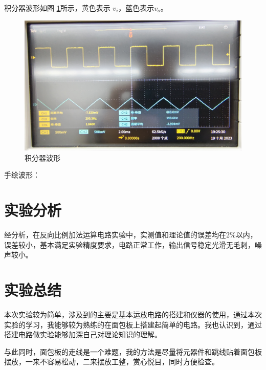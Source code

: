 \documentclass[a4paper]{article}
\theoremstyle{definition}
\theoremstyle{plain}
\theoremstyle{remark}
\newcommand{\reffig}[1]{图 \ref{#1}}
\begin{document}
积分器波形如\reffig{积分器波形}所示，黄色表示 $v_i$，蓝色表示$v_o$。
\begin{figure}[H]
	\centering
	\includegraphics[width=1\textwidth]{积分器波形}
	\caption{积分器波形}
	\label{积分器波形}
\end{figure}

手绘波形：
\section{实验分析}
经分析，在反向比例加法运算电路实验中，实测值和理论值的误差均在2\%以内，误差较小，基本满足实验精度要求，电路正常工作，输出信号稳定光滑无毛刺，噪声较小。
\section{实验总结}

本次实验较为简单，涉及到的主要是基本运放电路的搭建和仪器的使用，通过本次实验的学习，我能够较为熟练的在面包板上搭建起简单的电路。我也认识到，通过搭建电路做实验能够加深自己对理论知识的理解。

与此同时，面包板的走线是一个难题，我的方法是尽量将元器件和跳线贴着面包板摆放，一来不容易松动，二来摆放工整，赏心悦目，同时方便检查。

\clearpage
\appendix
{}
\end{document}
